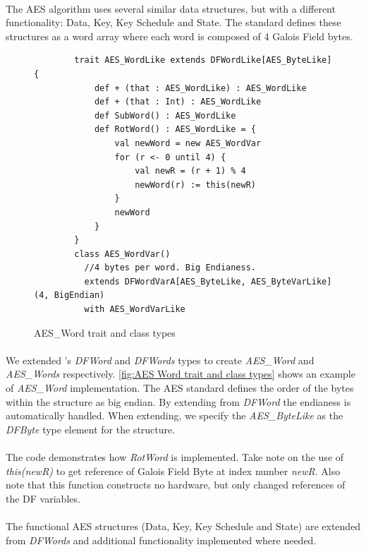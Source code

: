 \paragraph{}The AES algorithm uses several similar data structures, but with a different functionality: Data, Key, Key Schedule and State. The standard defines these structures as a word array where each word is composed of 4 Galois Field bytes. 
\begin{figure}[h]
	\centering
	\begin{verbatim}
		trait AES_WordLike extends DFWordLike[AES_ByteLike] {
			def + (that : AES_WordLike) : AES_WordLike
			def + (that : Int) : AES_WordLike
			def SubWord() : AES_WordLike
			def RotWord() : AES_WordLike = {
				val newWord = new AES_WordVar
				for (r <- 0 until 4) {
					val newR = (r + 1) % 4
					newWord(r) := this(newR)
				}
				newWord
			}
		}
		class AES_WordVar()
		  //4 bytes per word. Big Endianess.
		  extends DFWordVarA[AES_ByteLike, AES_ByteVarLike](4, BigEndian) 
		  with AES_WordVarLike
	\end{verbatim}
	\caption{AES\_Word trait and class types}\label{fig:AES Word trait and class types}
\end{figure}
\paragraph{}We extended \cfns's \textit{DFWord} and \textit{DFWords} types to create \textit{AES\_Word} and \textit{AES\_Words} respectively. \autoref{fig:AES Word trait and class types} shows an example of \textit{AES\_Word} implementation. The AES standard defines the order of the bytes within the structure as big endian. By extending from \textit{DFWord} the endianess is automatically handled. When extending, we specify the \textit{AES\_ByteLike} as the \textit{DFByte} type element for the structure.
\paragraph{}The code demonstrates how \textit{RotWord} is implemented. Take note on the use of \textit{this(newR)} to get reference of Galois Field Byte at index number \textit{newR}. Also note that this function constructs no hardware, but only changed references of the DF variables.
\paragraph{}The functional AES structures (Data, Key, Key Schedule and State) are extended from \textit{DFWords} and additional functionality implemented where needed.
 
